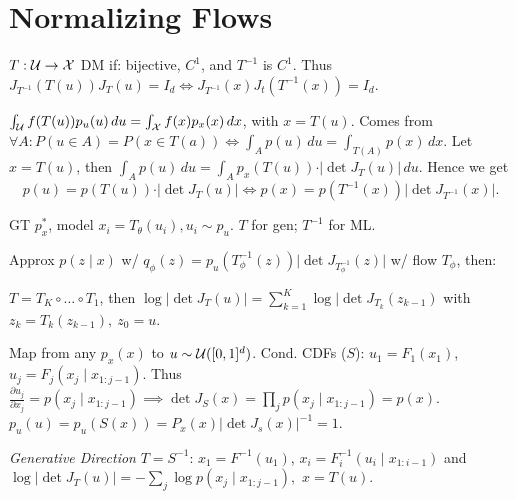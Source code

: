 \section{Normalizing Flows}

\begin{definition}
    \(T: \operatorname{\mathcal{U}} \to \operatorname{\mathcal{X}}\) DM if: bijective, \(C^1\), and \(T^{-1}\) is \(C^1\). Thus \(J_{T^{-1}}(T(u))J_T(u) = I_d \iff J_{T^{-1}}(x) J_t(T^{-1}(x)) = I_d\).
\end{definition}

\begin{definition}[COV]
    \(\int_{\operatorname{\mathcal{U}}} f(T(u)) p_u(u) \, du = \int_{\operatorname{\mathcal{X}}} f(x) p_x(x) \, dx\), with \(x = T(u)\). Comes from \(\forall A: P(u \in A) = P(x \in T(a)) \iff \int_A p(u) \, du = \int_{T(A)} p(x) \, dx\). Let \(x = T(u)\), then \(\int_A p(u) \, du = \int_A p_x(T(u)) \cdot \vert \det J_T(u) \vert \, du\). Hence we get \[p(u) = p(T(u)) \cdot \vert \det J_T(u)\vert \iff p(x) = p(T^{-1}(x)) \vert \det J_{T^{-1}}(x)\vert.\]
\end{definition}

\begin{definition}[{\color{H2}DM} by ML]
    GT \(p_x^*\), model \(x_i = T_\theta(u_i), u_i \sim p_u\). \(T\) for gen; \(T^{-1}\) for ML.
    
\end{definition}

\begin{definition}[{\color{H2}DM} by KL]
    Approx \(p(z \mid x)\) w/ \(q_\phi(z) = p_u(T_\phi^{-1}(z)) \vert \det J_{T_\phi^{-1}}(z)\vert\) w/ flow \(T_\phi\), then: 
\end{definition}

\begin{theorem}
    \(T = T_K \circ \ldots \circ T_1\), then \(\log \vert \det J_T(u) \vert = \sum_{k=1}^K \log \vert \det J_{T_k}(z_{k-1})\) with \(z_k = T_k(z_{k-1}), \ z_0 = u\).
\end{theorem}

\begin{definition}[Rosenblatt]
    Map from any \(p_x(x)\) to \(u \sim \operatorname{\mathcal{U}}([0, 1]^d)\). Cond. CDFs (\(S\)): \(u_1 = F_1(x_1)\), \(u_j = F_j(x_j \mid x_{1:j-1})\). Thus \(\frac{\partial u_j}{\partial x_j} = p(x_j \mid x_{1 : j-1}) \implies \det J_S(x) = \prod_j p(x_j \mid x_{1:j-1}) = p(x)\). \(p_u(u) = p_u(S(x)) = P_x(x) \vert \det J_s(x) \vert^{-1} = 1\).

    \textit{Generative Direction} \(T = S^{-1}\): \(x_1 = F^{-1}(u_1)\), \(x_i = F_i^{-1}(u_i \mid x_{1:i-1})\) and \(\log \vert \det J_T(u)\vert = - \sum_j \log p(x_j \mid x_{1:j-1}),\) \(x = T(u)\).
\end{definition}


